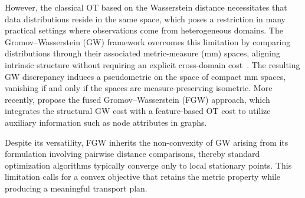 \documentclass{article}
\theoremstyle{plain}
\theoremstyle{definition}
\theoremstyle{remark}
\begin{document}
However, the classical OT based on the Wasserstein distance necessitates that data distributions reside in the same space, which poses a restriction in many practical settings where observations come from heterogeneous domains. The Gromov--Wasserstein (GW) framework overcomes this limitation by comparing distributions through their associated metric-measure (mm) spaces, aligning intrinsic structure without requiring an explicit cross-domain cost~\citep{memoli2011gromov}. The resulting GW discrepancy induces a pseudometric on the space of compact mm spaces, vanishing if and only if the spaces are measure-preserving isometric. More recently, \citet{vayer2020fused} propose the fused Gromov--Wasserstein (FGW) approach, which integrates the structural GW cost with a feature-based OT cost to utilize auxiliary information such as node attributes in graphs.

Despite its versatility, FGW inherits the non-convexity of GW arising from its formulation involving pairwise distance comparisons, thereby standard optimization algorithms typically converge only to local stationary points. This limitation calls for a convex objective that retains the metric property while producing a meaningful transport plan.

\end{document}
